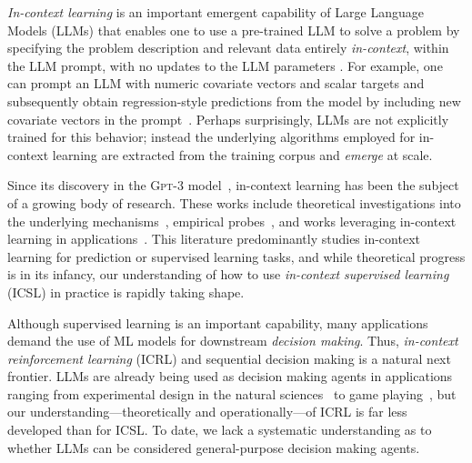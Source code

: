 
\emph{In-context learning} is an important emergent capability of Large Language Models (LLMs) that enables one to use a pre-trained LLM to solve a problem by specifying the problem description and relevant data entirely \emph{in-context}, \ie within the LLM prompt, with no updates to the LLM parameters \citep{gpt3-neurips20}.
For example, one can prompt an LLM with numeric covariate vectors and scalar targets and subsequently obtain regression-style predictions from the model by including new covariate vectors in the prompt~\citep{garg2022can}.
Perhaps surprisingly, LLMs are not explicitly trained for this behavior; instead
the underlying algorithms employed for in-context learning are extracted from the training corpus and \emph{emerge} at scale.

Since its discovery in the \textsc{Gpt-3} model~\citep{gpt3-neurips20}, in-context learning has been the subject of a growing body of research.
  These works include theoretical investigations into the underlying mechanisms~\citep[e.g.,][]{xie2021explanation,akyurek2022learning}, empirical probes~\citep[e.g.,][]{garg2022can,kirsch2022general}, and works leveraging in-context learning in applications~\citep[e.g.,][]{xu2022prompting,som2023demonstrations,edwards2023synergpt}.
This literature predominantly studies in-context learning for prediction or supervised learning tasks,
and while theoretical progress is in its infancy, our understanding of how to use \emph{in-context supervised learning} (ICSL) in practice is rapidly taking shape.\loose



Although supervised learning is an important capability, many applications demand the use of ML models for downstream \emph{decision making}.
Thus, \emph{in-context reinforcement learning} (ICRL) and sequential decision making is a natural next frontier. %
LLMs are already being used as decision making agents in applications ranging from experimental design in the natural sciences~\citep{lee2023ai} to game playing~\citep{shinn2023reflexion,wang2023voyager}, but our understanding---theoretically and operationally---of ICRL is far less developed than for ICSL.
To date, we lack a systematic understanding as to whether LLMs can be
considered general-purpose decision making agents.


